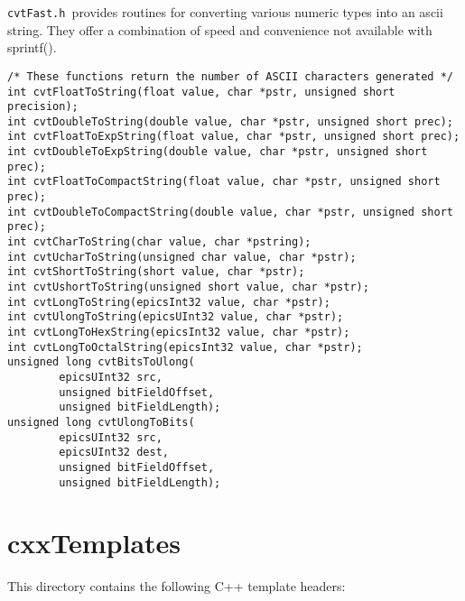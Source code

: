 \verb|cvtFast.h |provides routines for converting various numeric types into an ascii string. They offer a combination of 
speed and convenience not available with sprintf().

\begin{verbatim}/* These functions return the number of ASCII characters generated */
int cvtFloatToString(float value, char *pstr, unsigned short precision);
int cvtDoubleToString(double value, char *pstr, unsigned short prec);
int cvtFloatToExpString(float value, char *pstr, unsigned short prec);
int cvtDoubleToExpString(double value, char *pstr, unsigned short prec);
int cvtFloatToCompactString(float value, char *pstr, unsigned short prec);
int cvtDoubleToCompactString(double value, char *pstr, unsigned short prec);
int cvtCharToString(char value, char *pstring);
int cvtUcharToString(unsigned char value, char *pstr);
int cvtShortToString(short value, char *pstr);
int cvtUshortToString(unsigned short value, char *pstr);
int cvtLongToString(epicsInt32 value, char *pstr);
int cvtUlongToString(epicsUInt32 value, char *pstr);
int cvtLongToHexString(epicsInt32 value, char *pstr);
int cvtLongToOctalString(epicsInt32 value, char *pstr);
unsigned long cvtBitsToUlong(
        epicsUInt32 src,
        unsigned bitFieldOffset,
        unsigned bitFieldLength);
unsigned long cvtUlongToBits(
        epicsUInt32 src,
        epicsUInt32 dest,
        unsigned bitFieldOffset,
        unsigned bitFieldLength);
\end{verbatim}
\section{cxxTemplates}

This directory contains the following C++ template headers:

